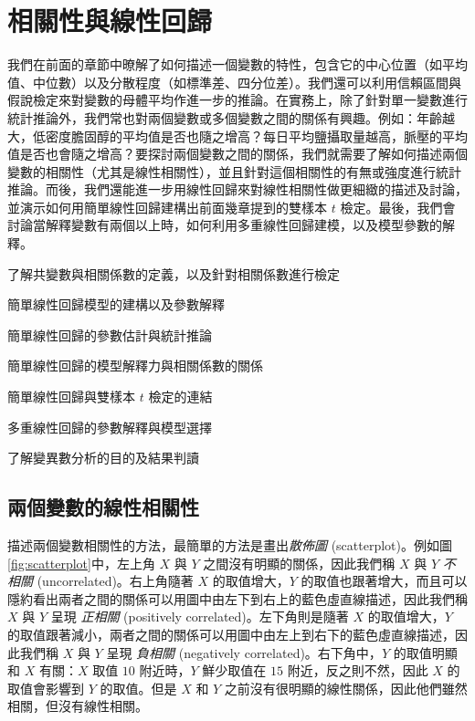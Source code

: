 \chapter{相關性與線性回歸}

    我們在前面的章節中暸解了如何描述一個變數的特性，包含它的中心位置（如平均值、中位數）以及分散程度（如標準差、四分位差）。我們還可以利用信賴區間與假說檢定來對變數的母體平均作進一步的推論。在實務上，除了針對單一變數進行統計推論外，我們常也對兩個變數或多個變數之間的關係有興趣。例如：年齡越大，低密度膽固醇的平均值是否也隨之增高？每日平均鹽攝取量越高，脈壓的平均值是否也會隨之增高？要探討兩個變數之間的關係，我們就需要了解如何描述兩個變數的相關性（尤其是線性相關性），並且針對這個相關性的有無或強度進行統計推論。而後，我們還能進一步用線性回歸來對線性相關性做更細緻的描述及討論，並演示如何用簡單線性回歸建構出前面幾章提到的雙樣本 $t$ 檢定。最後，我們會討論當解釋變數有兩個以上時，如何利用多重線性回歸建模，以及模型參數的解釋。
    
    \begin{introduction}
        \item 了解共變數與相關係數的定義，以及針對相關係數進行檢定
        \item 簡單線性回歸模型的建構以及參數解釋
        \item 簡單線性回歸的參數估計與統計推論
        \item 簡單線性回歸的模型解釋力與相關係數的關係
        \item 簡單線性回歸與雙樣本 $t$ 檢定的連結
        \item 多重線性回歸的參數解釋與模型選擇
        \item 了解變異數分析的目的及結果判讀
    \end{introduction}

\section{兩個變數的線性相關性}
    描述兩個變數相關性的方法，最簡單的方法是畫出\textit{散佈圖} (scatterplot)。例如圖\ref{fig:scatterplot}中，左上角 $X$ 與 $Y$ 之間沒有明顯的關係，因此我們稱 $X$ 與 $Y$ \textit{不相關} (uncorrelated)。右上角隨著 $X$ 的取值增大，$Y$ 的取值也跟著增大，而且可以隱約看出兩者之間的關係可以用圖中由左下到右上的藍色虛直線描述，因此我們稱 $X$ 與 $Y$ 呈現 \textit{正相關} (positively correlated)。左下角則是隨著 $X$ 的取值增大，$Y$ 的取值跟著減小，兩者之間的關係可以用圖中由左上到右下的藍色虛直線描述，因此我們稱 $X$ 與 $Y$ 呈現 \textit{負相關} (negatively correlated)。右下角中，$Y$ 的取值明顯和 $X$ 有關：$X$ 取值 $10$ 附近時，$Y$ 鮮少取值在 $15$ 附近，反之則不然，因此 $X$ 的取值會影響到 $Y$ 的取值。但是 $X$ 和 $Y$ 之前沒有很明顯的線性關係，因此他們雖然相關，但沒有線性相關。

